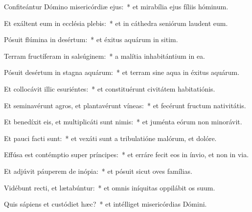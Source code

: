 
\item Confiteántur Dómino misericórdiæ ejus:~* et mirabília ejus fíliis hóminum.

\item Et exáltent eum in ecclésia plebis:~* et in cáthedra seniórum laudent eum.

\item Pósuit flúmina in desértum:~* et éxitus aquárum in sitim.

\item Terram fructíferam in salsúginem:~* a malítia inhabitántium in ea.

\item Pósuit desértum in stagna aquárum:~* et terram sine aqua in éxitus aquárum.

\item Et collocávit illic esuriéntes:~* et constituérunt civitátem habitatiónis.

\item Et seminavérunt agros, et plantavérunt víneas:~* et fecérunt fructum nativitátis.

\item Et benedíxit eis, et multiplicáti sunt nimis:~* et juménta eórum non minorávit.

\item Et pauci facti sunt:~* et vexáti sunt a tribulatióne malórum, et dolóre.

\item Effúsa est contémptio super príncipes:~* et erráre fecit eos in ínvio, et non in via.

\item Et adjúvit páuperem de inópia:~* et pósuit sicut oves famílias.

\item Vidébunt recti, et lætabúntur:~* et omnis iníquitas oppilábit os suum.

\item Quis sápiens et custódiet hæc?~* et intélliget misericórdias Dómini.